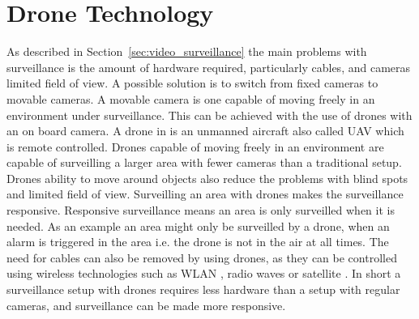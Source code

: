 \section{Drone Technology}
As described in Section~\ref{sec:video_surveillance} the main problems with surveillance is the amount of hardware required, particularly cables, and cameras limited field of view.
A possible solution is to switch from fixed cameras to movable cameras.
A movable camera is one capable of moving freely in an environment under surveillance.
This can be achieved with the use of drones with an on board camera.
A drone in \projectname{} is an unmanned aircraft also called UAV which is remote controlled.
Drones capable of moving freely in an environment are capable of surveilling a larger area with fewer cameras than a traditional setup.
Drones ability to move around objects also reduce the problems with blind spots and limited field of view.
Surveilling an area with drones makes the surveillance responsive.
Responsive surveillance means an area is only surveilled when it is needed.
As an example an area might only be surveilled by a drone, when an alarm is triggered in the area i.e. the drone is not in the air at all times.
The need for cables can also be removed by using drones, as they can be controlled using wireless technologies such as WLAN \citep{ardrone_developer_guide}, radio waves or satellite \citep{drone_freq}.
In short a surveillance setup with drones requires less hardware than a setup with regular cameras, and surveillance can be made more responsive.